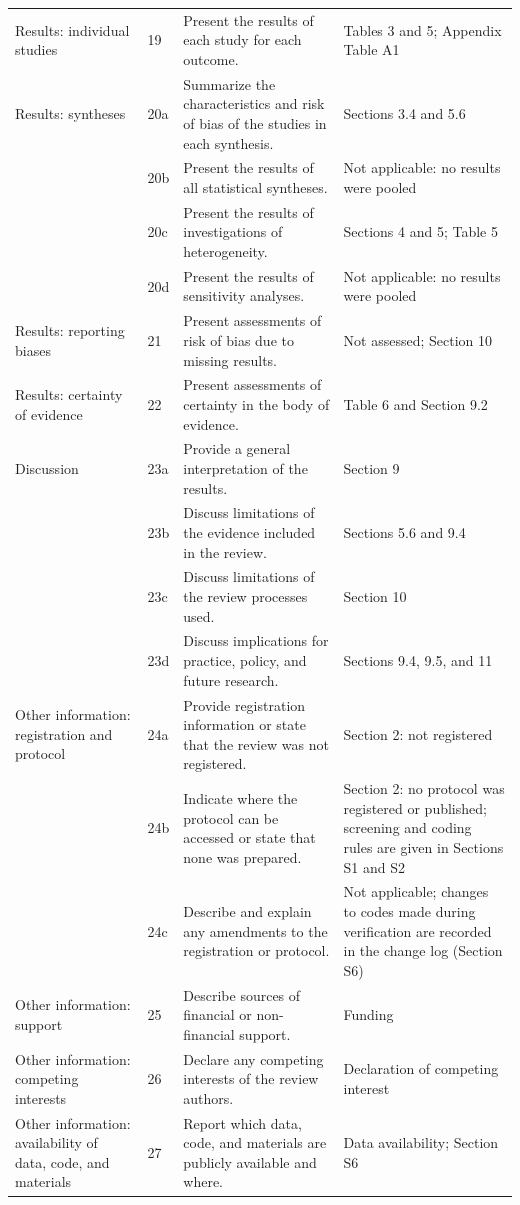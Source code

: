 \documentclass[a4paper,11pt]{article}
\begin{document}
\begin{footnotesize}
\begin{longtable}{@{}L{3.0cm}L{0.8cm}L{6.4cm}L{5.6cm}@{}}
Results: individual studies & 19 & Present the results of each study for each outcome. & Tables 3 and 5; Appendix Table A1\\
Results: syntheses & 20a & Summarize the characteristics and risk of bias of the studies in each synthesis. & Sections 3.4 and 5.6\\
 & 20b & Present the results of all statistical syntheses. & Not applicable: no results were pooled\\
 & 20c & Present the results of investigations of heterogeneity. & Sections 4 and 5; Table 5\\
 & 20d & Present the results of sensitivity analyses. & Not applicable: no results were pooled\\
Results: reporting biases & 21 & Present assessments of risk of bias due to missing results. & Not assessed; Section 10\\
Results: certainty of evidence & 22 & Present assessments of certainty in the body of evidence. & Table 6 and Section 9.2\\
Discussion & 23a & Provide a general interpretation of the results. & Section 9\\
 & 23b & Discuss limitations of the evidence included in the review. & Sections 5.6 and 9.4\\
 & 23c & Discuss limitations of the review processes used. & Section 10\\
 & 23d & Discuss implications for practice, policy, and future research. & Sections 9.4, 9.5, and 11\\
Other information: registration and protocol & 24a & Provide registration information or state that the review was not registered. & Section 2: not registered\\
 & 24b & Indicate where the protocol can be accessed or state that none was prepared. & Section 2: no protocol was registered or published; screening and coding rules are given in Sections S1 and S2\\
 & 24c & Describe and explain any amendments to the registration or protocol. & Not applicable; changes to codes made during verification are recorded in the change log (Section S6)\\
Other information: support & 25 & Describe sources of financial or non-financial support. & Funding\\
Other information: competing interests & 26 & Declare any competing interests of the review authors. & Declaration of competing interest\\
Other information: availability of data, code, and materials & 27 & Report which data, code, and materials are publicly available and where. & Data availability; Section S6\\
\end{longtable}
\end{footnotesize}
\end{document}

